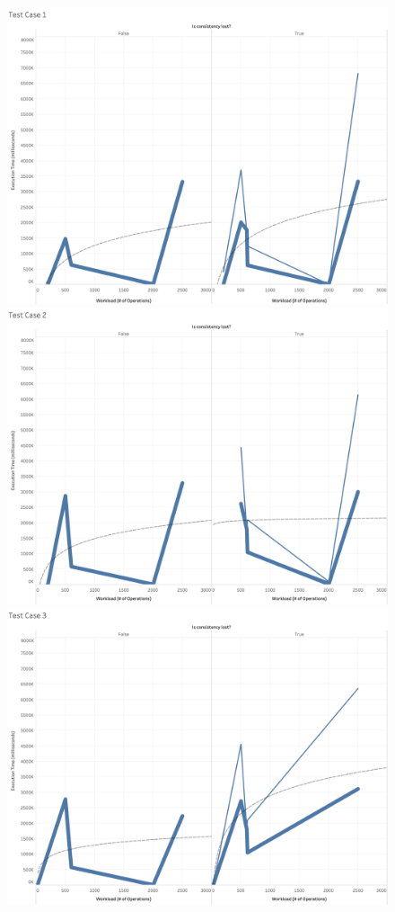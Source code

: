 \begin{figure}
\centering
\includegraphics[scale=0.11]{images/TestCase1(WL).png}
\includegraphics[scale=0.11]{images/TestCase2(WL).png}
\includegraphics[scale=0.11]{images/TestCase3(WL).png}

\end{figure}
